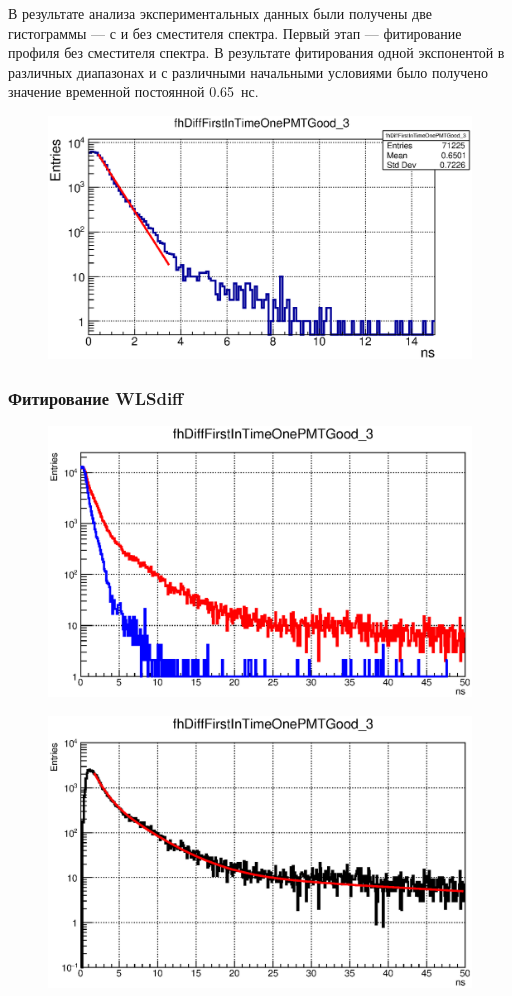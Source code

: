 В результате анализа экспериментальных данных были получены две гистограммы --- с и без сместителя спектра. Первый этап --- фитирование профиля без сместителя спектра. В результате фитирования одной экспонентой в различных диапазонах и с различными начальными условиями было получено значение временной постоянной 0.65~нс.

\begin{figure}[H]
\includegraphics[width=1.0\textwidth]{pictures/WLS_off_fitting.eps}
\caption{}
\label{fig:DirectPhotons}
\end{figure}

\subsubsection{Фитирование WLS\textunderscore diff}

\begin{figure}[H]
\includegraphics[width=1.0\textwidth]{pictures/WLS_curves.eps}
\caption{}
\label{fig:WlsCurves}
\end{figure}

\begin{figure}[H]
\includegraphics[width=1.0\textwidth]{pictures/diff_tripleTauFit_code682_1_1ns.eps}
\caption{}
\label{fig:WlsDiff}
\end{figure}